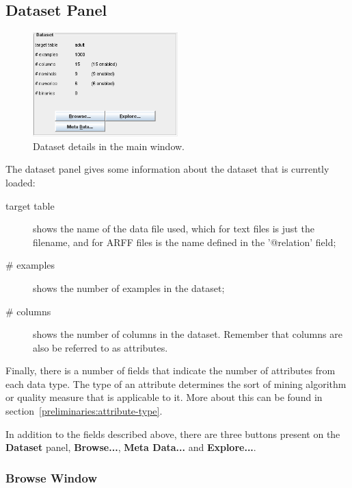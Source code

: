 \documentclass{article}
\begin{document}
\subsection{Dataset Panel}

\begin{figure}
\begin{center}
\includegraphics[width=0.5\textwidth]{dataset.png}
\caption{Dataset details in the main window.}
\end{center}
\label{fig:dataset}
\end{figure}

The dataset panel gives some information about the dataset that is currently loaded:
\begin{description}
\item[target table] shows the name of the data file used, which for text files is just the filename, and for ARFF files is the name defined in the '@relation' field;
\item[\# examples] shows the number of examples in the dataset;
\item[\# columns] shows the number of columns in the dataset.
Remember that columns are also be referred to as attributes.
\end{description}
Finally, there is a number of fields that indicate the number of attributes from each data type.
The type of an attribute determines the sort of mining algorithm or quality measure that is applicable to it.
More about this can be found in section~\ref{preliminaries:attribute-type}.

In addition to the fields described above, there are three buttons present on the {\bf Dataset} panel, {\bf Browse...}, {\bf Meta Data...} and {\bf Explore...}.

\subsubsection{Browse Window}
\end{document}
